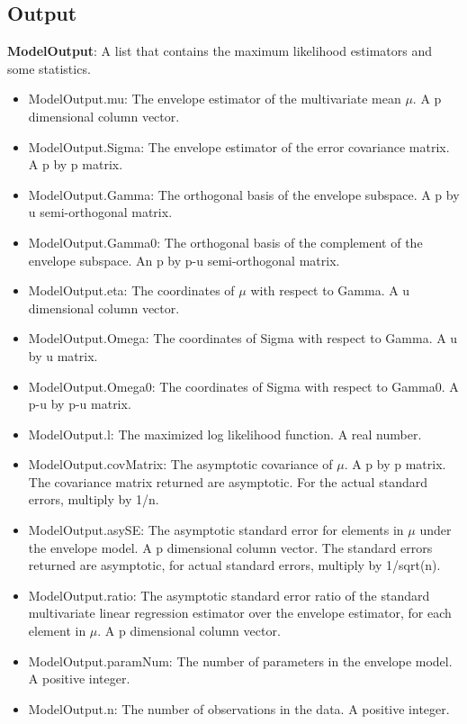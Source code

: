 \documentclass[a4paper,11pt,openany]{memoir}
\begin{document}
\subsection*{Output}

\begin{par}
\textbf{ModelOutput}: A list that contains the maximum likelihood estimators and some statistics.
\end{par} \vspace{1em}
\begin{itemize}
\setlength{\itemsep}{-1ex}
   \item ModelOutput.mu: The envelope estimator of the multivariate mean $\mu$. A p dimensional column vector.
   \item ModelOutput.Sigma: The envelope estimator of the error covariance matrix.  A p by p matrix.
   \item ModelOutput.Gamma: The orthogonal basis of the envelope subspace. A p by u semi-orthogonal matrix.
   \item ModelOutput.Gamma0: The orthogonal basis of the complement of the envelope subspace.  An p by p-u semi-orthogonal matrix.
   \item ModelOutput.eta: The coordinates of $\mu$ with respect to Gamma. A u dimensional column vector.
   \item ModelOutput.Omega: The coordinates of Sigma with respect to Gamma. A u by u matrix.
   \item ModelOutput.Omega0: The coordinates of Sigma with respect to Gamma0. A p-u by p-u matrix.
   \item ModelOutput.l: The maximized log likelihood function.  A real number.
   \item ModelOutput.covMatrix: The asymptotic covariance of $\mu$.  A p by p matrix.  The covariance matrix returned are asymptotic.  For the actual standard errors, multiply by 1/n.
   \item ModelOutput.asySE: The asymptotic standard error for elements in $\mu$ under the envelope model.  A p dimensional column vector.  The standard errors returned are asymptotic, for actual standard errors, multiply by 1/sqrt(n).
   \item ModelOutput.ratio: The asymptotic standard error ratio of the standard multivariate linear regression estimator over the envelope estimator, for each element in $\mu$.  A p dimensional column vector.
   \item ModelOutput.paramNum: The number of parameters in the envelope model.  A positive integer.
   \item ModelOutput.n: The number of observations in the data.  A positive integer.
\end{itemize}
\end{document}
